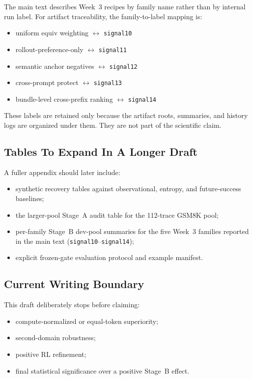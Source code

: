 The main text describes Week~3 recipes by family name rather than by internal run label. For artifact traceability, the family-to-label mapping is:

\begin{itemize}
  \item uniform equiv weighting $\leftrightarrow$ \texttt{signal10}
  \item rollout-preference-only $\leftrightarrow$ \texttt{signal11}
  \item semantic anchor negatives $\leftrightarrow$ \texttt{signal12}
  \item cross-prompt protect $\leftrightarrow$ \texttt{signal13}
  \item bundle-level cross-prefix ranking $\leftrightarrow$ \texttt{signal14}
\end{itemize}

These labels are retained only because the artifact roots, summaries, and history logs are organized under them. They are not part of the scientific claim.

\subsection{Tables To Expand In A Longer Draft}

A fuller appendix should later include:

\begin{itemize}
  \item synthetic recovery tables against observational, entropy, and future-success baselines;
  \item the larger-pool Stage~A audit table for the 112-trace GSM8K pool;
  \item per-family Stage~B dev-pool summaries for the five Week~3 families reported in the main text (\texttt{signal10}--\texttt{signal14});
  \item explicit frozen-gate evaluation protocol and example manifest.
\end{itemize}

\subsection{Current Writing Boundary}

This draft deliberately stops before claiming:

\begin{itemize}
  \item compute-normalized or equal-token superiority;
  \item second-domain robustness;
  \item positive RL refinement;
  \item final statistical significance over a positive Stage~B effect.
\end{itemize}

